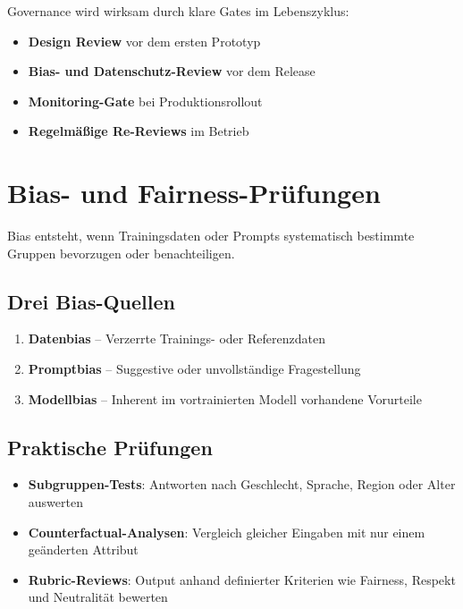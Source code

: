 Governance wird wirksam durch klare Gates im Lebenszyklus:

\begin{itemize}[leftmargin=*]
    \item \textbf{Design Review} vor dem ersten Prototyp
    \item \textbf{Bias- und Datenschutz-Review} vor dem Release
    \item \textbf{Monitoring-Gate} bei Produktionsrollout
    \item \textbf{Regelmäßige Re-Reviews} im Betrieb
\end{itemize}

\section{Bias- und Fairness-Prüfungen}

Bias entsteht, wenn Trainingsdaten oder Prompts systematisch bestimmte Gruppen bevorzugen oder benachteiligen.

\subsection{Drei Bias-Quellen}

\begin{enumerate}[leftmargin=*]
    \item \textbf{Datenbias} -- Verzerrte Trainings- oder Referenzdaten
    \item \textbf{Promptbias} -- Suggestive oder unvollständige Fragestellung
    \item \textbf{Modellbias} -- Inherent im vortrainierten Modell vorhandene Vorurteile
\end{enumerate}

\subsection{Praktische Prüfungen}

\begin{itemize}[leftmargin=*]
    \item \textbf{Subgruppen-Tests}: Antworten nach Geschlecht, Sprache, Region oder Alter auswerten
    \item \textbf{Counterfactual-Analysen}: Vergleich gleicher Eingaben mit nur einem geänderten Attribut
    \item \textbf{Rubric-Reviews}: Output anhand definierter Kriterien wie Fairness, Respekt und Neutralität bewerten
\end{itemize}

